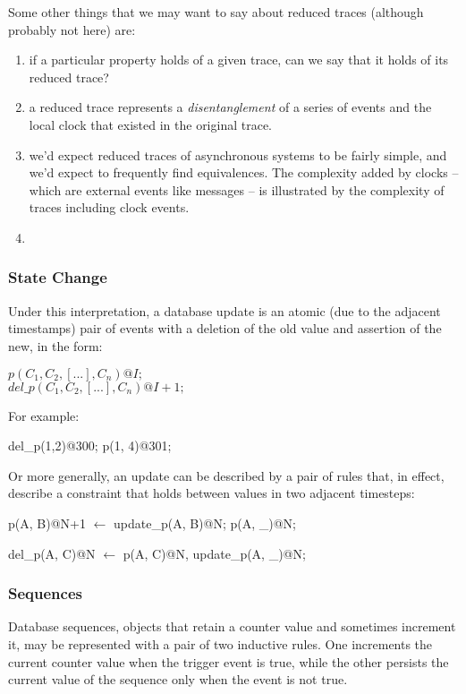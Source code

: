 Some other things that we may want to say about reduced traces (although probably not here) are:
\begin{enumerate}
\item if a particular property holds of a given trace, can we say that it holds of its reduced trace?
\item a reduced trace represents a \emph{disentanglement} of a series of events and the local clock that existed in the original trace.
\item we'd expect reduced traces of asynchronous systems to be fairly simple, and we'd expect to frequently find equivalences.
The complexity added by clocks -- which are external events like messages -- is illustrated by the complexity of traces including
clock events. 
\item 

\end{enumerate}


\subsubsection{State Change}

Under this interpretation, a database update is an atomic (due to the adjacent timestamps)
pair of events with a deletion of the old value and assertion of the new, in the form:

$p(C_{1},C_{2},[...],C_{n})@I;$
\\
$del\_p(C_{1},C_{2},[...],C_{n})@I+1;$

For example:

\begin{Dedalus}
del\_p(1,2)@300; 
p(1, 4)@301;
\end{Dedalus}

Or more generally, an update can be described by a pair of rules that, in effect, describe a
constraint that holds between values in two adjacent timesteps:

\begin{Dedalus}
p(A, B)@N+1 \(\leftarrow\)
  update_p(A, B)@N;
  p(A, _)@N;
  
del_p(A, C)@N \(\leftarrow\)
  p(A, C)@N,
  update_p(A, _)@N;
  
\end{Dedalus}

\subsubsection{Sequences}

Database sequences, objects that retain a counter value and sometimes increment it, may be
represented with a pair of two inductive rules.  One increments the current counter value when the
trigger event is true, while the other persists the current value of the sequence only when the event is 
not true.

